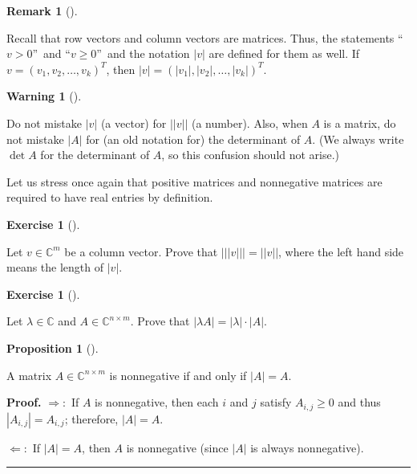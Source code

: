 \documentclass[numbers=enddot,12pt,final,onecolumn,notitlepage]{scrartcl}%
\newcounter{exer}
\numberwithin{exer}{subsection}
\theoremstyle{definition}
\newtheorem{prop}[theo]{Proposition}
\newenvironment{proposition}[1][]
{\begin{prop}[#1]\begin{leftbar}}
{\end{leftbar}\end{prop}}
\newtheorem{remk}[theo]{Remark}
\newenvironment{remark}[1][]
{\begin{remk}[#1]\begin{leftbar}}
{\end{leftbar}\end{remk}}
\newtheorem{warn}[theo]{Warning}
\newenvironment{warning}[1][]
{\begin{warn}[#1]\begin{leftbar}}
{\end{leftbar}\end{warn}}
\newtheorem{exmp}[exer]{Exercise}
\newenvironment{exercise}[1][]
{\begin{exmp}[#1]\begin{leftbar}}
{\end{leftbar}\end{exmp}}
\newenvironment{proof}[1][Proof]{\noindent\textbf{#1.} }{\ \rule{0.5em}{0.5em}}
\newenvironment{warning}[1][Warning]{\noindent\textbf{#1.} }{\ \rule{0.5em}{0.5em}}
\begin{document}
\begin{remark}
Recall that row vectors and column vectors are matrices. Thus, the statements
\textquotedblleft$v>0$\textquotedblright\ and \textquotedblleft$v\geq
0$\textquotedblright\ and the notation $\left\vert v\right\vert $ are defined
for them as well. If $v=\left(  v_{1},v_{2},\ldots,v_{k}\right)  ^{T}$, then
$\left\vert v\right\vert =\left(  \left\vert v_{1}\right\vert ,\left\vert
v_{2}\right\vert ,\ldots,\left\vert v_{k}\right\vert \right)  ^{T}$.
\end{remark}

\begin{warning}
Do not mistake $\left\vert v\right\vert $ (a vector) for $\left\vert
\left\vert v\right\vert \right\vert $ (a number). Also, when $A$ is a matrix,
do not mistake $\left\vert A\right\vert $ for (an old notation for) the
determinant of $A$. (We always write $\det A$ for the determinant of $A$, so
this confusion should not arise.)
\end{warning}

Let us stress once again that positive matrices and nonnegative matrices are
required to have real entries by definition.

\begin{exercise}
 Let $v\in\mathbb{C}^{m}$ be a column vector. Prove that $\left\vert
\left\vert \left\vert v\right\vert \right\vert \right\vert =\left\vert
\left\vert v\right\vert \right\vert $, where the left hand side means the
length of $\left\vert v\right\vert $.
\end{exercise}

\begin{exercise}
\label{exe.posmat.abs-lamA} Let $\lambda\in\mathbb{C}$ and
$A\in\mathbb{C}^{n\times m}$. Prove that $\left\vert \lambda A\right\vert
=\left\vert \lambda\right\vert \cdot\left\vert A\right\vert $.
\end{exercise}

\begin{proposition}
A matrix $A\in\mathbb{C}^{n\times m}$ is nonnegative if and only if
$\left\vert A\right\vert =A$.
\end{proposition}

\begin{proof}
$\Longrightarrow:$ If $A$ is nonnegative, then each $i$ and $j$ satisfy
$A_{i,j}\geq0$ and thus $\left\vert A_{i,j}\right\vert =A_{i,j}$; therefore,
$\left\vert A\right\vert =A$.

$\Longleftarrow:$ If $\left\vert A\right\vert =A$, then $A$ is nonnegative
(since $\left\vert A\right\vert $ is always nonnegative).
\end{proof}
\end{document}

